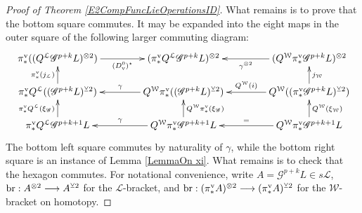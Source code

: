 \documentclass[11pt]{amsart} \renewcommand{\baselinestretch}{1.2}
\theoremstyle{plain}
\numberwithin{equation}{section} %
\theoremstyle{plain}
\numberwithin{equation}{chapter} %
\renewcommand{\to}{\longrightarrow}
\newcommand{\scrG}{\mathscr{G}}
\newcommand{\calL}{\mathcal{L}}
\newcommand{\calw}{\mathcal{W}}
\newcommand{\call}{\mathcal{L}}
\newcommand{\BSW}{{\scrG}}
\newcommand{\uver}{^\mathrm{v}}
\newcommand{\dver}{_\mathrm{v}}
\newcommand{\smashcoprod}{\veebar}%
\begin{document}
\begin{Operations in composite functor spectral sequences}
\begin{proof}[Proof of Theorem \ref{E2CompFuncLieOperationsID}]
What remains is to prove that the bottom square commutes. It may be expanded into the eight maps in the outer square of the following larger commuting diagram:
\[
\xymatrix@R=6mm@C=15mm@!0{
&%
\pi\uver_*((Q^{\calL}\BSW^{p+k}L)^{\otimes2}) \ar[rrr]_-{(D\dver^0)^\star}
&%
&%
&%
(\pi\uver_* Q^{\calL}\BSW^{p+k}L)^{\otimes2}&%
&%
&%
(Q^{\calw}\pi\uver_*\BSW^{p+k}L)^{\otimes2} \ar[lll]^-{\gamma^{\otimes2}}\\\\%
&%
\pi\uver_* Q^{\calL}((\BSW^{p+k}L)^{\smashcoprod 2})\ar[uu]^-{\pi\uver_*(j_{\calL})}
&%
&%
&%
Q^{\calw}\pi\uver_*((\BSW^{p+k}L)^{\smashcoprod 2})\ar[lll]_-{\gamma}
&%
&%
&%
Q^{\calw}((\pi\uver_* \BSW^{p+k}L)^{\smashcoprod 2})
\ar[uu]_-{j_{\calw}}
\ar[lll]_-{Q^{\calw}(i)}
\\\\
&%
\pi\uver_* Q^{\calL}\BSW^{p+k+1}L
\ar[uu]^-{\pi\uver_* Q^{\calL}(\xi_{\BSW})}
&%
&%
&%
Q^{\calw}\pi\uver_*\BSW^{p+k+1}L\ar[lll]_-{\gamma}
\ar[uu]_-{Q^{\calw}\pi\uver_*(\xi_{\BSW})}
&%
&%
&%
Q^{\calw}\pi\uver_* \BSW^{p+k+1}L
\ar[uu]_-{Q^{\calw}(\xi_{\calw})}
\ar[lll]_-{=}
}\]
The bottom left square commutes by naturality of $\gamma$, while the bottom right square is an instance of Lemma \ref{LemmaOn xi}. What remains is to check that the hexagon commutes. For notational convenience, write $A=\BSW^{p+k}L\in s\calL$, $\textup{br}:A^{\otimes 2}\to A^{\smashcoprod 2}$ for the $\call$-bracket, and
$\textup{br}:(\pi\uver_* A)^{\otimes 2}\to (\pi\uver_* A)^{\smashcoprod 2}$ for the $\calw$-bracket on homotopy.


\end{proof}
\end{Operations in composite functor spectral sequences}
\end{document}
